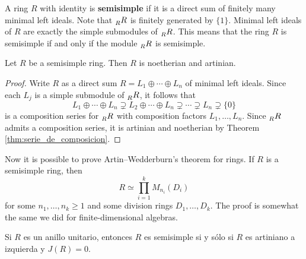 
A ring $R$ with identity is \textbf{semisimple} if it is a direct sum of finitely many minimal left ideals. Note
that $\prescript{}{R}{R}$ is finitely generated by $\{1\}$. Minimal left ideals of $R$ 
are exactly the simple submodules of $\prescript{}{R}{R}$. 
This means that 
the ring $R$ is semisimple if and only if the module
$\prescript{}{R}{R}$ is semisimple.  

\begin{proposition}
    Let $R$ be a semisimple ring. Then $R$ is noetherian and artinian.
\end{proposition}

\begin{proof}
    Write $R$ as a direct sum $R=L_1\oplus\cdots\oplus L_n$ of minimal left ideals. Since 
    each $L_j$ is a simple submodule of $\prescript{}{R}{R}$, it follows that 
    \[
    L_1\oplus\cdots\oplus L_n\supsetneq L_2\oplus\cdots\oplus L_n\supsetneq\cdots\supsetneq L_n\supsetneq\{0\}
    \]
    is a composition series for $\prescript{}{R}{R}$ with composition factors
    $L_1,\dots,L_n$. Since $\prescript{}{R}{R}$ admits a composition
    series, it is artinian and noetherian by Theorem \ref{thm:serie_de_composicion}.
\end{proof}

Now it is possible to prove Artin--Wedderburn's theorem for rings. 
If $R$ is a semisimple ring, then
\[
R\simeq \prod_{i=1}^k M_{n_i}(D_i)
\]
for some $n_1,\dots,n_k\geq1$ and some
division rings $D_1,\dots,D_k$. 
The proof is somewhat
the same we did for finite-dimensional algebras.

\begin{theorem}
	\label{thm:SSartin=J}
	Si $R$ es un anillo unitario, entonces $R$ es semisimple si y sólo si $R$
	es artiniano a izquierda y $J(R)=0$.
\end{theorem}

